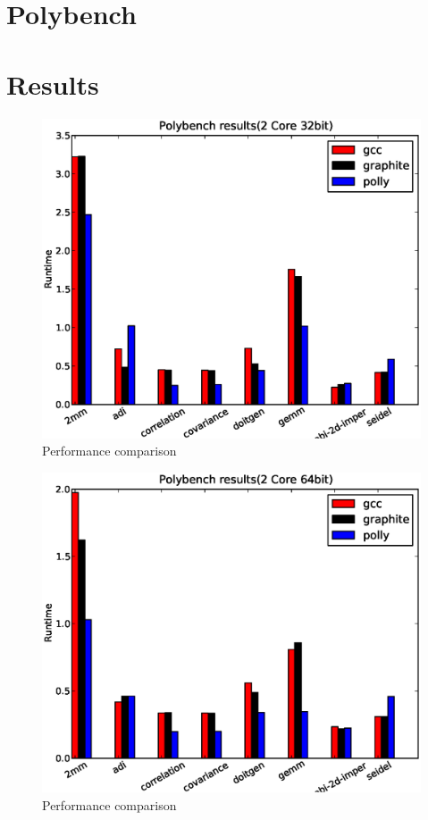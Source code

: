 \label{chap:testing}
\section{Polybench}

\section{Results}

\begin{figure}
  \label{fig:2core1}
  \includegraphics[width=1\textwidth]{images/2core32bit.eps}
  \caption{Performance comparison}
\end{figure}

\begin{figure}
  \label{fig:2core2}
  \includegraphics[width=1\textwidth]{images/2core64bit.eps}
  \caption{Performance comparison}
\end{figure}

